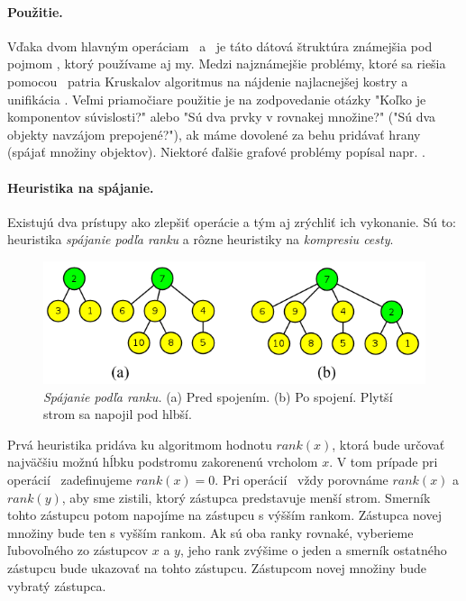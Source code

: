\paragraph{Použitie.}
Vďaka dvom hlavným operáciam \find\ a \union\ 
je táto dátová štruktúra známejšia pod pojmom \emph{\uf}, ktorý 
používame aj my. Medzi najznámejšie problémy, ktoré sa riešia pomocou 
\uf\ patria Kruskalov algoritmus na nájdenie najlacnejšej kostry 
\citep{kruskal} a unifikácia \citep{unif}. Veľmi priamočiare použitie je 
na zodpovedanie otázky "Koľko je komponentov súvislosti?" alebo
"Sú dva prvky v rovnakej množine?" ("Sú dva objekty navzájom prepojené?"), 
ak máme dovolené za behu pridávať hrany (spájať množiny objektov). 
Niektoré ďalšie grafové problémy popísal napr. \citet{paths1}.



\paragraph{Heuristika na spájanie.}
Existujú dva prístupy ako zlepšiť operácie a tým aj zrýchliť ich vykonanie. 
Sú to: heuristika \emph{spájanie podľa ranku} a rôzne heuristiky na 
\emph{kompresiu cesty}. 

\begin{figure}
\includegraphics[width=\columnwidth]{obrazky/union.png}
\caption{\emph{Spájanie podľa ranku.} (a) Pred spojením. (b) Po spojení. 
Plytší strom sa napojil pod hlbší.} 
\label{img:union} 
\end{figure}

Prvá heuristika pridáva ku algoritmom hodnotu 
$rank(x)$, ktorá bude určovať najväčšiu možnú hĺbku podstromu zakorenenú 
vrcholom $x$. V tom prípade pri o\-pe\-rá\-cií \makeset\ zadefinujeme 
$rank(x) = 0$. 
Pri o\-pe\-rá\-cií \union\ vždy porovnáme $rank(x)$ a $rank(y)$, aby sme zistili, 
ktorý zástupca predstavuje menší strom. Smerník tohto zástupcu potom napojíme 
na zástupcu s výšším rankom. Zástupca novej množiny bude ten s vyšším rankom. 
Ak sú oba ranky rovnaké, vyberieme ľubovoľného zo zástupcov $x$ a $y$, 
jeho rank zvýšime o jeden a smerník ostatného zástupcu bude ukazovať 
na tohto zástupcu. Zástupcom novej množiny bude vybratý zástupca. 

